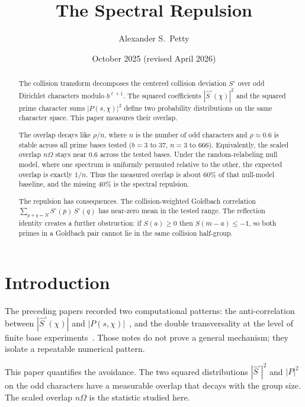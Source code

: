 \documentclass[12pt]{amsart}
\title{The Spectral Repulsion}
\author{Alexander S.\ Petty}
\date{October 2025 (revised April 2026)}
\theoremstyle{definition}
\theoremstyle{remark}
\begin{document}
\begin{abstract}
The collision transform decomposes the centered
collision deviation $S^{\circ}$ over odd Dirichlet
characters modulo $b^{\ell+1}$. The squared
coefficients $|\hat{S}^{\circ}(\chi)|^2$ and the
squared prime character sums $|P(s, \chi)|^2$ define
two probability distributions on the same character
space. This paper measures their overlap.

The overlap decays like $\rho / n$, where $n$ is the
number of odd characters and $\rho \approx 0.6$ is
stable across all prime bases tested ($b = 3$ to $37$,
$n = 3$ to $666$). Equivalently, the scaled overlap
$n\Omega$ stays near $0.6$ across the tested bases.
Under the random-relabeling null model, where one
spectrum is uniformly permuted relative to the other,
the expected overlap is exactly $1/n$. Thus the
measured overlap is about $60\%$ of that null-model
baseline, and the missing $40\%$ is the spectral
repulsion.

The repulsion has consequences. The collision-weighted
Goldbach correlation $\sum_{p+q=N} S^{\circ}(p)\,
S^{\circ}(q)$ has near-zero mean in the tested range.
The reflection identity creates a further
obstruction: if $S(a) \ge 0$ then $S(m{-}a) \le -1$,
so both primes in a Goldbach pair cannot lie in the
same collision half-group.
\end{abstract}
\maketitle

\section{Introduction}

The preceding papers recorded two computational
patterns: the anti-correlation between
$|\hat{S}^{\circ}(\chi)|$ and $|P(s, \chi)|$~\cite{paper19},
and the double transversality at the level of finite
base experiments~\cite{paper20}. Those notes do not
prove a general mechanism; they isolate a repeatable
numerical pattern.

This paper quantifies the avoidance. The two squared
distributions $|\hat{S}^{\circ}|^2$ and $|P|^2$ on
the odd characters have a measurable overlap that
decays with the group size. The scaled overlap
$n\Omega$ is the statistic studied here.

\end{document}
